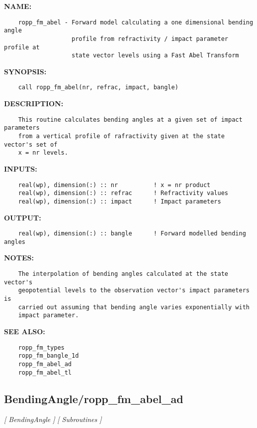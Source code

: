 \label{ch:robo0}
\label{ch:BendingAngle_ropp_fm_abel}
\textbf{NAME:}\hspace{0.08in}\begin{Verbatim}
    ropp_fm_abel - Forward model calculating a one dimensional bending angle
                   profile from refractivity / impact parameter profile at
                   state vector levels using a Fast Abel Transform
\end{Verbatim}
\textbf{SYNOPSIS:}\hspace{0.08in}\begin{Verbatim}
    call ropp_fm_abel(nr, refrac, impact, bangle)
\end{Verbatim}
\textbf{DESCRIPTION:}\hspace{0.08in}\begin{Verbatim}
    This routine calculates bending angles at a given set of impact parameters
    from a vertical profile of rafractivity given at the state vector's set of
    x = nr levels. 
\end{Verbatim}
\textbf{INPUTS:}\hspace{0.08in}\begin{Verbatim}
    real(wp), dimension(:) :: nr          ! x = nr product
    real(wp), dimension(:) :: refrac      ! Refractivity values
    real(wp), dimension(:) :: impact      ! Impact parameters
\end{Verbatim}
\textbf{OUTPUT:}\hspace{0.08in}\begin{Verbatim}
    real(wp), dimension(:) :: bangle      ! Forward modelled bending angles
\end{Verbatim}
\textbf{NOTES:}\hspace{0.08in}\begin{Verbatim}
    The interpolation of bending angles calculated at the state vector's
    geopotential levels to the observation vector's impact parameters is
    carried out assuming that bending angle varies exponentially with
    impact parameter.
\end{Verbatim}
\textbf{SEE ALSO:}\hspace{0.08in}\begin{Verbatim}
    ropp_fm_types
    ropp_fm_bangle_1d
    ropp_fm_abel_ad
    ropp_fm_abel_tl
\end{Verbatim}
\subsection{BendingAngle/ropp\_fm\_abel\_ad}
\textsl{[ BendingAngle ]}
\textsl{[ Subroutines ]}

